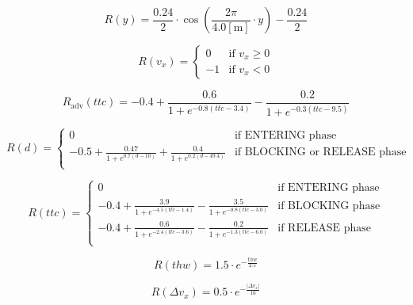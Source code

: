 \documentclass[12pt, a4paper]{report}
\begin{document}
\begin{equation}
    R(y) = \frac{0.24}{2} \cdot \cos\left(\frac{2\pi}{4.0 \mathrm{[m]}} \cdot y\right) - \frac{0.24}{2}
\end{equation}

\begin{equation}
    R(v_x) = \begin{cases}
        0 & \text{if } v_x \geq 0 \\
        -1 & \text{if } v_x < 0
    \end{cases}
\end{equation}

\begin{equation}
    R_{\mathrm{adv}}(ttc) = -0.4 + \frac{0.6}{1 + e^{-0.8 (ttc - 3.4)}} - \frac{0.2}{1 + e^{-0.3 (ttc - 9.5)}}
\end{equation}

\begin{equation}
    R(d) = \begin{cases}
        0 & \text{if ENTERING phase}\\
        -0.5 + \frac{0.47}{1 + e^{0.7 (d - 10)}} + \frac{0.4}{1 + e^{0.2 (d - 49.4)}} & \text{if BLOCKING or RELEASE phase} \\
    \end{cases}
\end{equation}


\begin{equation}
    R(ttc) = \begin{cases}
        0 & \text{if ENTERING phase} \\
        -0.4 + \frac{3.9}{1 + e^{-4.5 (ttc - 1.4)}} - \frac{3.5}{1 + e^{-0.8 (ttc - 3.0)}} & \text{if BLOCKING phase} \\
        -0.4 + \frac{0.6}{1 + e^{-2.4 (ttc - 3.6)}} - \frac{0.2}{1 + e^{-1.3 (ttc - 6.0)}} & \text{if RELEASE phase} \\
    \end{cases}
\end{equation}

\begin{equation}
    R(thw) = 1.5 \cdot e^{-\frac{thw}{2.5}}
\end{equation}

\begin{equation}
    R(\Delta v_{x}) = 0.5 \cdot e^{-\frac{|\Delta v_{x}|}{16}}
\end{equation}
\end{document}
